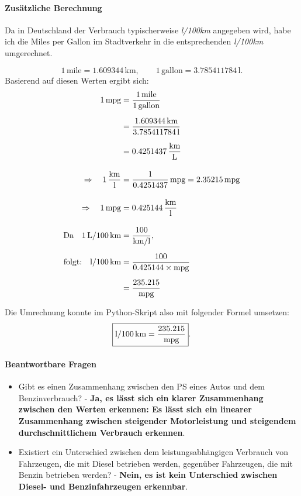\documentclass[a4paper,12pt]{article}
\begin{document}
\paragraph{Zusätzliche Berechnung} \break
Da in Deutschland der Verbrauch typischerweise \textit{l/100km} angegeben wird, habe ich die Miles per Gallon im Stadtverkehr in die entsprechenden \textit{l/100km} umgerechnet.

 \break

\[
1\,\text{mile} = 1.609344\,\text{km}, 
\qquad 
1\,\text{gallon} = 3.785411784\,\text{l}.
\]
Basierend auf diesen Werten ergibt sich:
\[
\begin{aligned}
1\,\text{mpg} 
&= \frac{1\,\text{mile}}{1\,\text{gallon}} \\[6pt]
&= \frac{1.609344\,\text{km}}{3.785411784\,\text{l}} \\[6pt]
&= 0.4251437\,\frac{\text{km}}{\text{L}} \\[10pt]
\Rightarrow \quad
1\,\frac{\text{km}}{\text{l}}
&= \frac{1}{0.4251437}\,\text{mpg} 
= 2.35215\,\text{mpg} \\[10pt]
\Rightarrow \quad
1\,\text{mpg} 
&= 0.425144\,\frac{\text{km}}{\text{l}} \\[10pt]
\text{Da} \quad
1\,\text{L}/100\,\text{km} 
&= \frac{100}{\text{km}/\text{l}}, \\[6pt]
\text{folgt:} \quad
\text{l/100\,km} 
&= \frac{100}{0.425144 \times \text{mpg}} \\[6pt]
&= \frac{235.215}{\text{mpg}}
\end{aligned}
\]

Die Umrechnung konnte im Python-Skript also mit folgender Formel umsetzen:
\[
\boxed{\text{l/100\,km} = \frac{235.215}{\text{mpg}}}.
\]

\hfill \break


\paragraph{Beantwortbare Fragen}
\begin{itemize}
  \item Gibt es einen Zusammenhang zwischen den PS eines Autos und dem Benzinverbrauch? - 
    \textbf{Ja, es lässt sich ein klarer Zusammenhang zwischen den Werten erkennen: Es lässt sich ein linearer Zusammenhang zwischen steigender Motorleistung und steigendem durchschnittlichem Verbrauch erkennen}.
  \item Existiert ein Unterschied zwischen dem leistungsabhängigen Verbrauch von Fahrzeugen, die mit Diesel betrieben werden, gegenüber
    Fahrzeugen, die mit Benzin betrieben werden? - \textbf{Nein, es ist kein Unterschied zwischen Diesel- und Benzinfahrzeugen erkennbar}.
\end{itemize}
\end{document}
